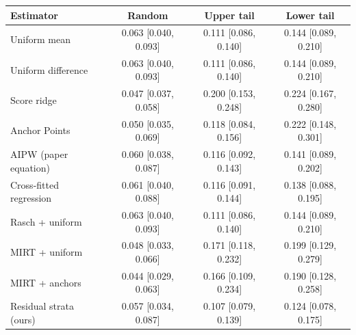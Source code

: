 \begin{tabular}{lccc}
\toprule
Estimator & Random & Upper tail & Lower tail \\
\midrule
Uniform mean & 0.063 [0.040, 0.093] & 0.111 [0.086, 0.140] & 0.144 [0.089, 0.210] \\
Uniform difference & 0.063 [0.040, 0.093] & 0.111 [0.086, 0.140] & 0.144 [0.089, 0.210] \\
Score ridge & 0.047 [0.037, 0.058] & 0.200 [0.153, 0.248] & 0.224 [0.167, 0.280] \\
Anchor Points & 0.050 [0.035, 0.069] & 0.118 [0.084, 0.156] & 0.222 [0.148, 0.301] \\
AIPW (paper equation) & 0.060 [0.038, 0.087] & 0.116 [0.092, 0.143] & 0.141 [0.089, 0.202] \\
Cross-fitted regression & 0.061 [0.040, 0.088] & 0.116 [0.091, 0.144] & 0.138 [0.088, 0.195] \\
Rasch + uniform & 0.063 [0.040, 0.093] & 0.111 [0.086, 0.140] & 0.144 [0.089, 0.210] \\
MIRT + uniform & 0.048 [0.033, 0.066] & 0.171 [0.118, 0.232] & 0.199 [0.129, 0.279] \\
MIRT + anchors & 0.044 [0.029, 0.063] & 0.166 [0.109, 0.234] & 0.190 [0.128, 0.258] \\
Residual strata (ours) & 0.057 [0.034, 0.087] & 0.107 [0.079, 0.139] & 0.124 [0.078, 0.175] \\
\bottomrule
\end{tabular}
